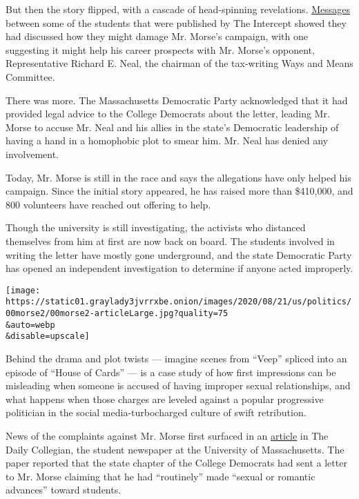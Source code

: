 But then the story flipped, with a cascade of head-spinning revelations.
\href{https://theintercept.com/2020/08/12/alex-morse-college-democrats-chats/}{Messages}
between some of the students that were published by The Intercept showed
they had discussed how they might damage Mr. Morse's campaign, with one
suggesting it might help his career prospects with Mr. Morse's opponent,
Representative Richard E. Neal, the chairman of the tax-writing Ways and
Means Committee.

There was more. The Massachusetts Democratic Party acknowledged that it
had provided legal advice to the College Democrats about the letter,
leading Mr. Morse to accuse Mr. Neal and his allies in the state's
Democratic leadership of having a hand in a homophobic plot to smear
him. Mr. Neal has denied any involvement.

Today, Mr. Morse is still in the race and says the allegations have only
helped his campaign. Since the initial story appeared, he has raised
more than \$410,000, and 800 volunteers have reached out offering to
help.

Though the university is still investigating, the activists who
distanced themselves from him at first are now back on board. The
students involved in writing the letter have mostly gone underground,
and the state Democratic Party has opened an independent investigation
to determine if anyone acted improperly.

\texttt{[image: https://static01.graylady3jvrrxbe.onion/images/2020/08/21/us/politics/00morse2/00morse2-articleLarge.jpg?quality=75\\\&auto=webp\\\&disable=upscale]}

Behind the drama and plot twists --- imagine scenes from ``Veep''
spliced into an episode of ``House of Cards'' --- is a case study of how
first impressions can be misleading when someone is accused of having
improper sexual relationships, and what happens when those charges are
leveled against a popular progressive politician in the social
media-turbocharged culture of swift retribution.

News of the complaints against Mr. Morse first surfaced in an
\href{https://dailycollegian.com/2020/08/college-democrats-allege-inappropriate-misconduct-between-holyoke-mayor-alex-morse-and-college-students/}{article}
in The Daily Collegian, the student newspaper at the University of
Massachusetts. The paper reported that the state chapter of the College
Democrats had sent a letter to Mr. Morse claiming that he had
``routinely'' made ``sexual or romantic advances'' toward students.

